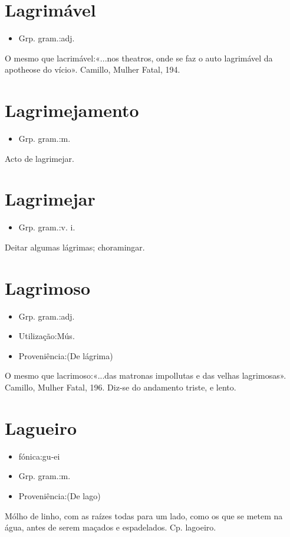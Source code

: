 \section{Lagrimável}
\begin{itemize}
\item {Grp. gram.:adj.}
\end{itemize}
O mesmo que \textunderscore lacrimável\textunderscore :«\textunderscore ...nos theatros, onde se faz o auto lagrimável da apotheose do vício\textunderscore ». Camillo, \textunderscore Mulher Fatal\textunderscore , 194.
\section{Lagrimejamento}
\begin{itemize}
\item {Grp. gram.:m.}
\end{itemize}
Acto de lagrimejar.
\section{Lagrimejar}
\begin{itemize}
\item {Grp. gram.:v. i.}
\end{itemize}
Deitar algumas lágrimas; choramingar.
\section{Lagrimoso}
\begin{itemize}
\item {Grp. gram.:adj.}
\end{itemize}
\begin{itemize}
\item {Utilização:Mús.}
\end{itemize}
\begin{itemize}
\item {Proveniência:(De \textunderscore lágrima\textunderscore )}
\end{itemize}
O mesmo que \textunderscore lacrimoso\textunderscore :«\textunderscore ...das matronas impollutas e das velhas lagrimosas\textunderscore ». Camillo, \textunderscore Mulher Fatal\textunderscore , 196.
Diz-se do andamento triste, e lento.
\section{Lagueiro}
\begin{itemize}
\item {fónica:gu-ei}
\end{itemize}
\begin{itemize}
\item {Grp. gram.:m.}
\end{itemize}
\begin{itemize}
\item {Proveniência:(De \textunderscore lago\textunderscore )}
\end{itemize}
Mólho de linho, com as raízes todas para um lado, como os que se metem na água, antes de serem maçados e espadelados.
Cp. \textunderscore lagoeiro\textunderscore .
